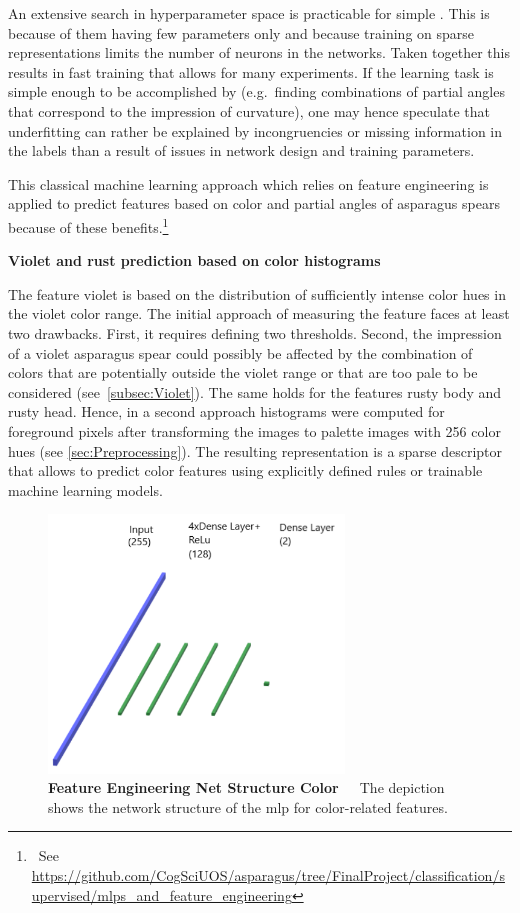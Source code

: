 An extensive search in hyperparameter space is practicable for simple . This is because of them having few parameters only and because training on sparse representations limits the number of neurons in the networks. Taken together this results in fast training that allows for many experiments. If the learning task is simple enough to be accomplished by  (e.g.\ finding combinations of partial angles that correspond to the impression of curvature), one may hence speculate that underfitting can rather be explained by incongruencies or missing information in the labels than a result of issues in network design and training parameters. 

This classical machine learning approach which relies on feature engineering is applied to predict features based on color and partial angles of asparagus spears because of these benefits.\footnote{~See \url{https://github.com/CogSciUOS/asparagus/tree/FinalProject/classification/supervised/mlps\_and\_feature\_engineering}}

\bigskip
\textbf{Violet and rust prediction based on color histograms} 

The feature violet is based on the distribution of sufficiently intense color hues in the violet color range. The initial approach of measuring the feature faces at least two drawbacks. First, it requires defining two thresholds. Second, the impression of a violet asparagus spear could possibly be affected by the combination of colors that are potentially outside the violet range or that are too pale to be considered (see~\autoref{subsec:Violet}). The same holds for the features rusty body and rusty head. Hence, in a second approach histograms were computed for foreground pixels after transforming the images to palette images with 256 color hues (see \autoref{sec:Preprocessing}). The resulting representation is a sparse descriptor that allows to predict color features using explicitly defined rules or trainable machine learning models.

\begin{figure}[!htb]
	\centering
	\includegraphics[width=0.70\textwidth]{Figures/chapter04/fe_color.png}
	\decoRule
	\caption[Feature Engineering Net Structure Color]{\textbf{Feature Engineering Net Structure Color}~~~The depiction shows the network structure of the \acrshort{mlp} for color-related features.}
	\label{fig:FeatureEngineeringNetStructureColor}
\end{figure}


